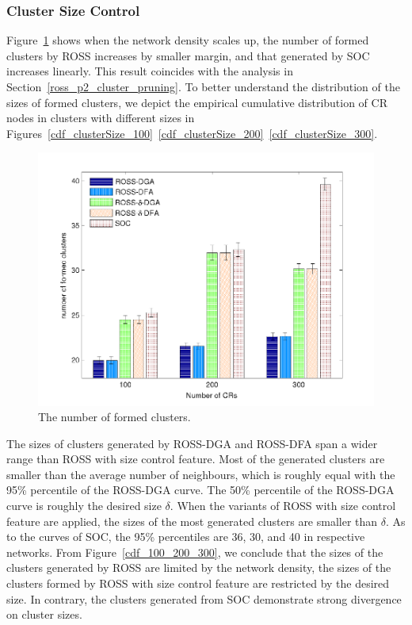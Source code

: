 \documentclass[10pt,journal,compsoc]{IEEEtran}
\theoremstyle{mytheoremstyle}
\theoremstyle{mytheoremstyle}
\theoremstyle{mytheoremstyle}
\begin{document}
\subsubsection{Cluster Size Control}
Figure~\ref{nClusters_largeNetwork} shows when the network density scales up, the number of formed clusters by ROSS increases by smaller margin, and that generated by SOC increases linearly.
This result coincides with the analysis in Section~\ref{ross_p2_cluster_pruning}.
To better understand the distribution of the sizes of formed clusters, we depict the empirical cumulative distribution of CR nodes in clusters with different sizes in Figures~\ref{cdf_clusterSize_100}~\ref{cdf_clusterSize_200}~\ref{cdf_clusterSize_300}.
\begin{figure}[!h]
  \centering
   \includegraphics[width=0.7\linewidth]{nClusters_largeNetwork.pdf}
  \caption{The number of formed clusters.}
  \label{nClusters_largeNetwork}
\end{figure}
The sizes of clusters generated by ROSS-DGA and ROSS-DFA span a wider range than ROSS with size control feature.
Most of the generated clusters are smaller than the average number of neighbours, which is roughly equal with the 95\% percentile of the ROSS-DGA curve.
The 50\% percentile of the ROSS-DGA curve is roughly the desired size $\delta$.
When the variants of ROSS with size control feature are applied, the sizes of the most generated clusters are smaller than $\delta$.
As to the curves of SOC, the 95\% percentiles are 36, 30, and 40 in respective networks.
%
From Figure~\ref{cdf_100_200_300}, we conclude that the sizes of the clusters generated by ROSS are limited by the network density, the sizes of the clusters formed by ROSS with size control feature are restricted by the desired size.
In contrary, the clusters generated from SOC demonstrate strong divergence on cluster sizes.
\end{document}
